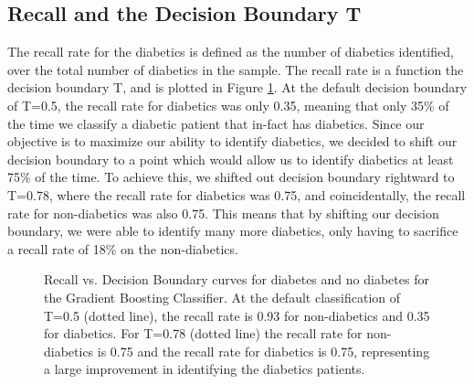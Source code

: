 \documentclass{article} %
\begin{document}
\subsection{Recall and the Decision Boundary T}
The recall rate for the diabetics is defined as the number of diabetics identified, over the total number of diabetics in the sample. The recall rate is a function the decision boundary T, and is plotted in Figure \ref{recall_decision}. At the default decision boundary of T=0.5, the recall rate for diabetics was only 0.35, meaning that only 35\% of the time we classify a diabetic patient that in-fact has diabetics. Since our objective is to maximize our ability to identify diabetics, we decided to shift our decision boundary to a point which would allow us to identify diabetics at least 75\% of the time. To achieve this, we shifted out decision boundary rightward to T=0.78, where the recall rate for diabetics was 0.75, and coincidentally, the recall rate for non-diabetics was also 0.75. This means that by shifting our decision boundary, we were able to identify many more diabetics, only having to sacrifice a recall rate of 18\% on the non-diabetics. 

\begin{figure}[h]
\begin{center}
\end{center}
\caption{Recall vs. Decision Boundary curves for diabetes and no diabetes for the Gradient Boosting Classifier. At the default classification of T=0.5 (dotted line), the recall rate is 0.93 for non-diabetics and 0.35 for diabetics. For T=0.78 (dotted line) the recall rate for non-diabetics is 0.75 and the recall rate for diabetics is 0.75, representing a large improvement in identifying the diabetics patients.}
\label{recall_decision}
\end{figure}
\end{document}
